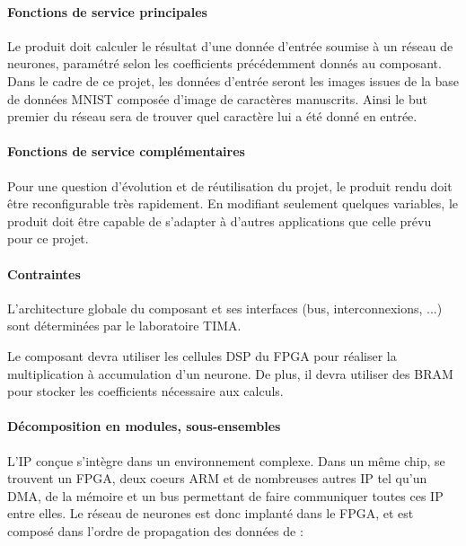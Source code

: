 \paragraph{Fonctions de service principales\\}

Le produit doit calculer le résultat d'une donnée d'entrée soumise à un réseau
de neurones, paramétré selon les coefficients précédemment donnés au composant. 
Dans le cadre de ce projet, les données d'entrée seront les images issues de la base de données MNIST composée d'image de caractères manuscrits. 
Ainsi le but premier du réseau sera de trouver quel caractère lui a été donné en entrée. 

\paragraph{Fonctions de service complémentaires\\}
Pour une question d'évolution et de réutilisation du projet, le produit rendu doit être reconfigurable très rapidement.
En modifiant seulement quelques variables, le produit doit être capable de s'adapter à d'autres applications que celle prévu pour ce projet.

\paragraph{Contraintes\\}

L'architecture globale du composant et ses interfaces (bus, interconnexions, ...) sont déterminées
par le laboratoire TIMA.

Le composant devra utiliser les cellules DSP du FPGA pour réaliser la multiplication à accumulation 
d'un neurone. De plus, il devra utiliser des BRAM pour stocker les coefficients nécessaire aux calculs.

\paragraph{Décomposition en modules, sous-ensembles\\}

L'IP conçue s'intègre dans un environnement complexe. 
Dans un même chip, se trouvent un FPGA, deux coeurs ARM et de nombreuses autres IP tel qu'un DMA, 
de la mémoire et un bus permettant de faire communiquer toutes ces IP entre elles. 
Le réseau de neurones est donc implanté dans le FPGA, et est composé dans l'ordre de propagation des données de :

